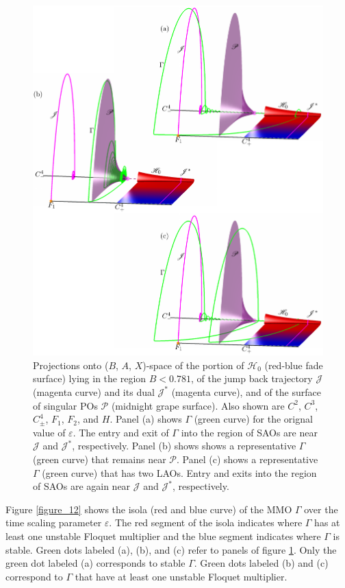 \documentclass{ws-ijbc}
\begin{document}
\begin{figure}[H]
\centering
\includegraphics[]{./figures/MKMO_14.pdf}
\caption{Projections onto ($B$, $A$, $X$)-space of the portion of $\mathscr{H}_0$ (red-blue fade surface) lying in the region $B<0.781$, of the jump back trajectory $\mathscr{J}$ (magenta curve) and its dual $\mathscr{J}^*$ (magenta curve), and of the surface of singular POs $\mathscr{P}$ (midnight grape surface).  Also shown are $C^2$, $C^3$, $C^4_\pm$, $F_1$, $F_2$, and $H$.  Panel (a) shows $\Gamma$ (green curve) for the orignal value of $\varepsilon$.  The entry and exit of $\Gamma$ into the region of SAOs are near $\mathscr{J}$ and $\mathscr{J}^*$, respectively.  Panel (b) shows shows a representative $\Gamma$ (green curve) that remains near $\mathscr{P}$.  Panel (c) shows a representative $\Gamma$ (green curve) that has two LAOs.  Entry and exits into the region of SAOs are again near $\mathscr{J}$ and $\mathscr{J}^*$, respectively.}
\label{figure_14}
\end{figure}


Figure \ref{figure_12} shows the isola (red and blue curve) of the MMO $\Gamma$ over the time scaling parameter $\varepsilon$.  The red segment of the isola indicates where $\Gamma$ has at least one unstable Floquet multiplier and the blue segment indicates where $\Gamma$ is stable.  Green dots labeled (a), (b), and (c) refer to panels of figure \ref{figure_14}.  Only the green dot labeled (a) corresponds to stable $\Gamma$.  Green dots labeled (b) and (c) correspond to $\Gamma$ that have at least one unstable Floquet multiplier.
\end{document}
